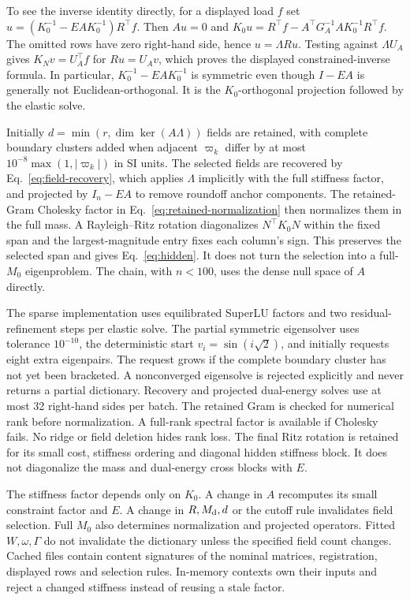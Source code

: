 To see the inverse identity directly, for a displayed load $f$ set
$u=(K_0^{-1}-EAK_0^{-1})R^{\top}f$. Then $Au=0$ and
$K_0u=R^{\top}f-A^{\top}G_A^{-1}AK_0^{-1}R^{\top}f$.
The omitted rows have zero right-hand side, hence $u=\Lambda Ru$.
Testing against $\Lambda U_A$ gives $K_Nv=U_A^{\top}f$ for $Ru=U_Av$,
which proves the displayed constrained-inverse formula. In particular,
$K_0^{-1}-EAK_0^{-1}$ is symmetric even though $I-EA$ is generally not
Euclidean-orthogonal. It is the $K_0$-orthogonal projection followed by
the elastic solve.

Initially $d=\min(r,\dim\ker(A\Lambda))$ fields are retained, with complete
boundary clusters added when adjacent $\varpi_k$ differ by at most
$10^{-8}\max(1,|\varpi_k|)$ in SI units. The selected fields are recovered
by Eq.~\eqref{eq:field-recovery}, which applies $\Lambda$ implicitly with
the full stiffness factor, and projected by $I_n-EA$ to remove roundoff
anchor components. The retained-Gram Cholesky factor in
Eq.~\eqref{eq:retained-normalization} then normalizes them in the full mass.
A Rayleigh--Ritz rotation
diagonalizes $N^{\top}K_0N$ within the fixed span and the largest-magnitude
entry fixes each column's sign. This preserves the selected span and gives
Eq.~\eqref{eq:hidden}. It does not turn the selection into a full-$M_0$
eigenproblem. The chain, with
$n<100$, uses the dense null space of $A$ directly.

The sparse implementation uses equilibrated SuperLU factors and two
residual-refinement steps per elastic solve. The partial symmetric
eigensolver uses tolerance $10^{-10}$, the deterministic start
$v_i=\sin(i\sqrt2)$, and initially requests eight extra eigenpairs.
The request grows if the complete boundary cluster has not yet been
bracketed. A nonconverged eigensolve is rejected explicitly and never
returns a partial dictionary. Recovery and projected dual-energy
solves use at most 32 right-hand sides per batch. The retained Gram is
checked for numerical rank before normalization. A full-rank spectral
factor is available if Cholesky fails. No ridge or field deletion hides rank
loss. The final Ritz rotation is retained for its small
cost, stiffness ordering and diagonal hidden stiffness block. It does not
diagonalize the mass and dual-energy cross blocks with $E$.

The stiffness factor depends only on $K_0$. A change in $A$ recomputes its
small constraint factor and $E$. A change in $R,M_{\rm d},d$ or the cutoff
rule invalidates field selection. Full $M_0$ also determines normalization
and projected operators. Fitted $W,\omega,\Gamma$ do not invalidate the
dictionary unless the specified field count changes. Cached files contain
content signatures of the nominal matrices, registration, displayed rows
and selection rules. In-memory contexts own their inputs and reject a
changed stiffness instead of reusing a stale factor.

